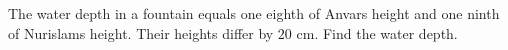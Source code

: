 The water depth in a fountain equals one eighth of Anvar\textquotesingle s height and one ninth of Nurislam\textquotesingle s height. Their heights differ by $20$ cm. Find the water depth.
